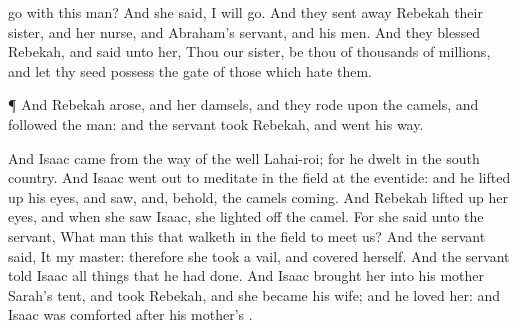 {go with this
man? And she
said, I will
go.
And they sent
away
Rebekah their
sister, and her
nurse, and
Abraham’s
servant, and his
men.
And they
blessed
Rebekah, and
said unto her,
Thou
{} our
sister, be
thou
{} of
thousands of
millions, and let thy
seed
possess the
gate of those which
hate them.
\par }{\PP {}¶ And
Rebekah
arose, and her
damsels, and they
rode upon the
camels, and
followed the
man: and the
servant
took
Rebekah, and went his
way.
\par }{\PP {}And
Isaac
came from the
way of the well
Lahai-roi; for he
dwelt in the
south
country.
And
Isaac went
out to
meditate in the
field
at the
eventide: and he lifted
up his
eyes, and
saw, and, behold, the
camels
{}
coming.
And
Rebekah lifted
up her
eyes, and when she
saw
Isaac, she
lighted
off the
camel.
For she
{}
said unto the
servant,
What
man
{}
this that
walketh in the
field to meet
us? And the
servant
{}
said, It
{} my
master: therefore she
took a
vail, and covered
herself.
And the
servant
told
Isaac all
things that he had
done.
And
Isaac brought
her into his
mother
Sarah’s
tent, and
took
Rebekah, and she became his
wife; and he
loved her: and
Isaac was
comforted
after his
mother’s
{}.

}

